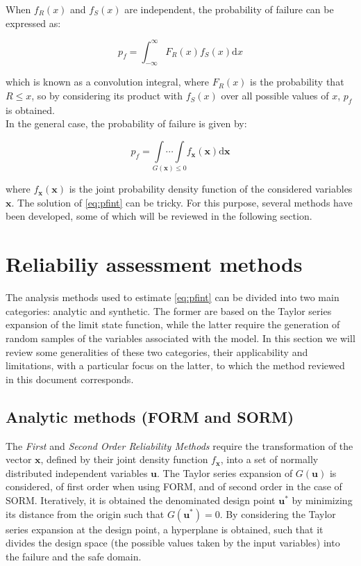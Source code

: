 When $f_R(x)$ and $f_S(x)$ are independent, the probability of failure can be expressed as:

\begin{equation}
    p_f = \int_{-\infty}^{\infty} F_R(x)f_S(x)\mathrm{d}x
\end{equation}

which is known as a convolution integral, where $F_R(x)$ is the probability that $R \leq x$, so by considering its product with $f_S(x)$ over all possible values of $x$, $p_f$ is obtained. \\

In the general case, the probability of failure is given by:

\begin{equation} \label{eq:pfint}
    p_f = \underset{G(\bm{x})\leq 0}{\int \cdots \int}f_{\bm{x}}(\bm{x})\mathrm{d}\bm{x}
\end{equation}

where $f_{\bm{x}}(\bm{x})$ is the joint probability density function of the considered variables $\bm{x}$. The solution of \ref{eq:pfint} can be tricky. For this purpose, several methods have been developed, some of which will be reviewed in the following section.

\section{Reliabiliy assessment methods}

The analysis methods used to estimate \ref{eq:pfint} can be divided into two main categories: analytic and synthetic. The former are based on the Taylor series expansion of the limit state function, while the latter require the generation of random samples of the variables associated with the model. In this section we will review some generalities of these two categories, their applicability and limitations, with a particular focus on the latter, to which the method reviewed in this document corresponds.

\subsection{Analytic methods (FORM and SORM)}
The \textit{First} and \textit{Second Order Reliability Methods} require the transformation of the vector $\bm{x}$, defined by their joint density function $f_{\bm{x}}$, into a set of normally distributed independent variables $\bm{u}$. The Taylor series expansion of $G(\bm{u})$ is considered, of first order when using FORM, and of second order in the case of SORM. Iteratively, it is obtained the denominated design point $\bm{u^*}$ by minimizing its distance from the origin such that $G(\bm{u^*})=0$. By considering the Taylor series expansion at the design point, a hyperplane is obtained, such that it divides the design space (the possible values taken by the input variables) into the failure and the safe domain. \\

